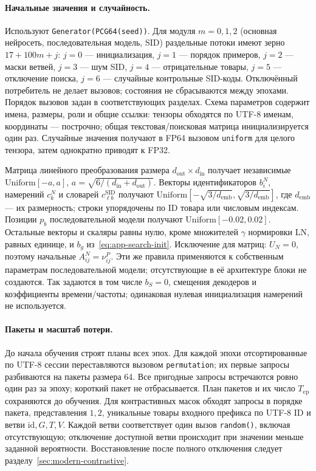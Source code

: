 \documentclass[12pt,a4paper]{article}
\newcommand{\code}[1]{{\ttfamily\small\nolinkurl{#1}}}
\theoremstyle{plainru}
\begin{document}
\paragraph{Начальные значения и случайность.}
Используют \code{Generator(PCG64(seed))}. Для модуля $m=0,1,2$
(основная нейросеть, последовательная модель, SID) раздельные
потоки имеют зерно $17+100m+j$: $j=0$ --- инициализация,
$j=1$ --- порядок примеров, $j=2$ --- маски ветвей,
$j=3$ --- шум SID, $j=4$ --- отрицательные товары,
$j=5$ --- отключение поиска, $j=6$ --- случайные контрольные SID-коды.
Отключённый потребитель не делает вызовов; состояния не сбрасываются
между эпохами. Порядок вызовов задан в соответствующих разделах.
Схема параметров содержит имена, размеры, роли и общие ссылки:
тензоры обходятся по UTF-8 именам, координаты --- построчно;
общая текстовая/поисковая матрица инициализируется один раз.
Случайные значения получают в FP64 вызовом \code{uniform} для целого
тензора, затем однократно приводят к FP32.

Матрица линейного преобразования размера $d_{\mathrm{out}}\times
d_{\mathrm{in}}$ получает независимые
$\mathrm{Uniform}[-a,a]$, $a=\sqrt{6/(d_{\mathrm{in}}+d_{\mathrm{out}})}$.
Векторы идентификаторов $b_i^N$, намерений $c_k^N$ и словарей
$c_{\ell b}^{\mathrm{SID}}$ получают
$\mathrm{Uniform}[-\sqrt{3/d_{\mathrm{emb}}},\sqrt{3/d_{\mathrm{emb}}}]$,
где $d_{\mathrm{emb}}$ --- их размерность;
строки упорядочены по ID товара или числовым индексам.
Позиции $p_b$ последовательной модели получают
$\mathrm{Uniform}[-0.02,0.02]$. Остальные векторы и скаляры равны нулю,
кроме множителей $\gamma$ нормировки LN, равных единице,
и $b_g$ из~\eqref{eq:app-search-init}.
Исключение для матриц: $U_N=0$, поэтому начальные $A_{ij}^N=\nu_{ij}^P$.
Эти же правила применяются к собственным параметрам последовательной
модели; отсутствующие в её архитектуре блоки не создаются.
Так задаются в том числе $b_S=0$, смещения декодеров и коэффициенты
времени/частоты; одинаковая нулевая инициализация намерений не используется.

\paragraph{Пакеты и масштаб потери.}
До начала обучения строят планы всех эпох. Для каждой эпохи
отсортированные по UTF-8 сессии переставляются вызовом
\code{permutation}; их первые запросы разбиваются на пакеты размера 64.
Все пригодные запросы встречаются ровно один раз за эпоху;
короткий пакет не отбрасывается. План пакетов и их число
$T_{\mathrm{ep}}$ сохраняются до обучения.
Для контрастивных масок обходят запросы в порядке пакета, представления
$1,2$, уникальные товары входного префикса по UTF-8 ID и ветви
$\mathrm{id},G,T,V$. Каждой ветви соответствует один вызов
\code{random()}, включая отсутствующую; отключение доступной ветви
происходит при значении меньше заданной вероятности. Восстановление
после полного отключения следует разделу~\ref{sec:modern-contrastive}.
\end{document}
